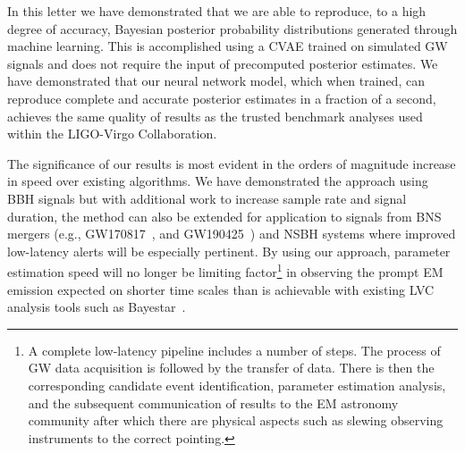 \documentclass[%
showpacs,
nofootinbib,
 amsmath,amssymb,
 aps,
 twocolumn,
 prl,
 reprint,
floatfix,
]{revtex4-1}
\begin{document}
%
%

%
%
%
In this letter we have demonstrated that we are able to reproduce, to a high
degree of accuracy, Bayesian posterior probability distributions generated
through machine learning. This is accomplished using a \ac{CVAE} trained on
simulated \ac{GW} signals and does not require the input of precomputed
posterior estimates. We have demonstrated that our neural network model, which
when trained, can reproduce complete and accurate posterior estimates in
a fraction of a second, achieves the same quality of results as the
trusted benchmark analyses used within the LIGO-Virgo Collaboration.

%
%
The significance of our results is most evident in the orders of magnitude
increase in speed over existing algorithms. We have demonstrated the approach
using \ac{BBH} signals but with additional work to increase sample rate
and signal duration, the method can also be extended for application to
signals from \ac{BNS} mergers (e.g., GW170817~\cite{PhysRevLett.119.161101},
and GW190425~\cite{2020ApJ...892L...3A}) and \ac{NSBH} systems where
improved low-latency alerts will be especially pertinent. By using our
approach, parameter estimation speed will no longer be limiting
factor\footnote{A complete low-latency pipeline includes a number of
steps. The process of \ac{GW} data acquisition is followed by the transfer of
data. There is then the corresponding candidate event identification,
parameter estimation analysis, and the subsequent communication of results to
the \ac{EM} astronomy community after which there are physical aspects such as
slewing observing instruments to the correct pointing.} in observing the prompt
\ac{EM} emission expected on shorter time scales than is achievable with
existing \ac{LVC} analysis tools such as Bayestar~\cite{2016PhRvD..93b4013S}.
\end{document}
